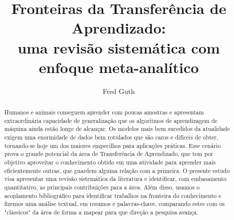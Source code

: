 \documentclass[sigconf]{acmart}
\begin{document}
%
\title[Fronteiras da Transferência de Aprendizado: uma revisão sistemática com enfoque meta-analítico]{Fronteiras da Transferência de Aprendizado: \\
uma revisão sistemática com enfoque meta-analítico}
%

\author{Fred Guth}

\renewcommand{\shortauthors}{Guth, F.}

%
\begin{abstract}
  Humanos e animais conseguem aprender com poucas amostras \cite{goodfellow} e apresentam extraordinária capacidade de generalização que os algoritmos de aprendizagem de máquina ainda estão longe de alcançar. Os modelos mais bem sucedidos da atualidade exigem uma enormidade de dados bem rotulados que são caros e difíceis de obter, tornando-se hoje um dos maiores empecilhos para aplicações práticas. Esse cenário prova o grande potencial da área de Transferência de Aprendizado, que tem por objetivo aproveitar o conhecimento obtido em uma atividade para aprender mais eficientemente outras, que guardem alguma relação com a primeira. O presente estudo visa apresentar uma revisão sistemática da literatura e identificar, com embasamento quantitativo, as principais contribuições para a área. Além disso, usamos o acoplamento bibliográfico para identificar trabalhos na fronteira do conhecimento e fizemos uma análise textual, em resumos e palavras-chave, comparando estes com os "clássicos" da área de forma a mapear para que direção a pesquisa avança.  
\end{abstract}

%
%
\end{document}
